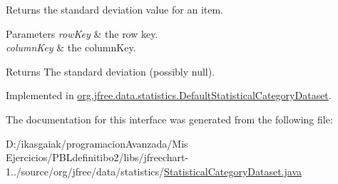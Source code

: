 Returns the standard deviation value for an item.


\begin{DoxyParams}{Parameters}
{\em row\+Key} & the row key. \\
\hline
{\em column\+Key} & the column\+Key.\\
\hline
\end{DoxyParams}
\begin{DoxyReturn}{Returns}
The standard deviation (possibly {\ttfamily null}). 
\end{DoxyReturn}


Implemented in \mbox{\hyperlink{classorg_1_1jfree_1_1data_1_1statistics_1_1_default_statistical_category_dataset_a5e3534fe65d917d61794a94a4287556f}{org.\+jfree.\+data.\+statistics.\+Default\+Statistical\+Category\+Dataset}}.



The documentation for this interface was generated from the following file\+:\begin{DoxyCompactItemize}
\item 
D\+:/ikasgaiak/programacion\+Avanzada/\+Mis Ejercicios/\+P\+B\+Ldefinitibo2/libs/jfreechart-\/1../source/org/jfree/data/statistics/\mbox{\hyperlink{_statistical_category_dataset_8java}{Statistical\+Category\+Dataset.\+java}}\end{DoxyCompactItemize}
